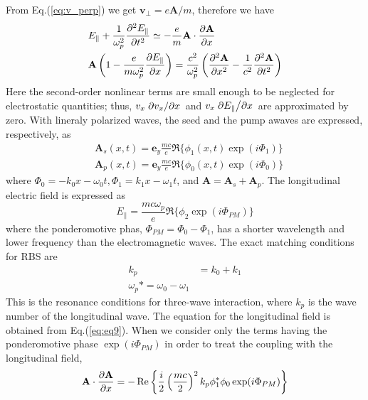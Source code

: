 \documentclass{article}
\begin{document}
    From Eq.(\ref{eq:v_perp}) we get $\mathbf{v}_{\perp}=e\mathbf{A}/m$, therefore we have
    \begin{align}
        &E_{\parallel} + \frac{1}{\omega_p^2}\pdv[2]{E_{\parallel}}{t} \simeq - \frac{e}{m}\mathbf{A}\cdot\pdv{\mathbf{A}}{x} \label{eq:eq9} \\
        &\mathbf{A}\left( 1 - \frac{e}{m\omega_p^2}\pdv{E_{\parallel}}{x} \right) = \frac{c^2}{\omega_p^2}\left( \pdv[2]{\mathbf{A}}{x} - \frac{1}{c^2}\pdv[2]{\mathbf{A}}{t} \right) \label{eq:eq10}
    \end{align}
    Here the second-order nonlinear terms are small enough to be neglected for electrostatic quantities; thus, $v_x\pdv*{v_x}{x}$ and $v_x\pdv*{E_{\parallel}}{x}$ are approximated by zero.
    With lineraly polarized waves, the seed and the pump awaves are expressed, respectively, as
    \begin{align}
        &\mathbf{A}_s(x,t) = \mathbf{e}_y\frac{mc}{e}\Re\{ \phi_1(x,t)\exp(i\Phi_1) \} \\
        &\mathbf{A}_p(x,t) = \mathbf{e}_y\frac{mc}{e}\Re\{ \phi_0(x,t)\exp(i\Phi_0) \}
    \end{align}
    where $\Phi_0=-k_0x-\omega_0t, \Phi_1=k_1x-\omega_1t$, and $\mathbf{A}=\mathbf{A}_s+\mathbf{A}_p$. The longitudinal electric field is expressed as 
    \begin{equation}
        E_{\parallel} = \frac{mc\omega_p}{e} \Re \{ \phi_2\exp(i\Phi_{PM}) \}
    \end{equation}
    where the ponderomotive phas, $\Phi_{PM}=\Phi_0-\Phi_1$, has a shorter wavelength and lower frequency than the electromagnetic waves. The exact matching conditions for RBS are
    \begin{equation} \label{eq:resonance_conditions}
        \begin{aligned}
            k_p &= k_0+k_1 \\
            \omega_p * = \omega_0-\omega_1
        \end{aligned}
    \end{equation}
    This is the resonance conditions for three-wave interaction,
    where $k_p$ is the wave number of the longitudinal wave.
    The equation for the longitudinal field is obtained from Eq.(\ref{eq:eq9}). When we consider only the terms having the ponderomotive phase $\exp(i\Phi_{PM})$ in order to treat the coupling with the longitudinal field,
    \begin{equation}
        \mathbf{A}\cdot\pdv{\mathbf{A}}{x} = -\Re\left\{ \frac{i}{2}\left(\frac{mc}{2}\right)^2 k_p\phi_1^*\phi_0\exp(i\Phi_{PM}) \right\}
    \end{equation}
\end{document}

